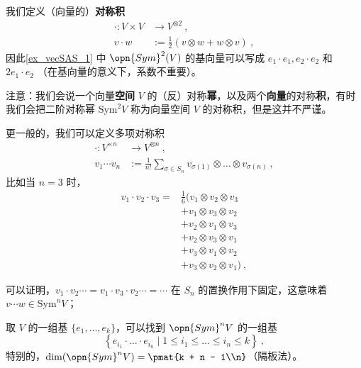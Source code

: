 我们定义（向量的）\textbf{对称积}
\begin{equation}
\begin{aligned}
\cdot: V \times V &\to V^{\otimes 2}~, \\
v \cdot w &:= \frac12 (v \otimes w + w \otimes v)~,
\end{aligned}
\end{equation}
因此\autoref{ex_vecSAS_1} 中 $\opn{Sym}^2(V)$ 的基向量可以写成 $e_1 \cdot e_1, e_2 \cdot e_2$ 和 $2 e_1 \cdot e_2$ （在基向量的意义下，系数不重要）。


注意：我们会说一个向量\textbf{空间} $V$ 的（反）对称\textbf{幂}，以及两个\textbf{向量}的对称\textbf{积}，有时我们会把二阶对称幂 $\text{Sym}^2 V$ 称为向量空间 $V$ 的对称积，但是这并不严谨。

更一般的，我们可以定义多项对称积
\begin{equation}
\begin{aligned}
\cdot: V^{\times n} &\to V^{\otimes n}~, \\
v_1 \cdots v_n &:= \frac{1}{n!} \sum_{\sigma \in S_n} v_{\sigma(1)} \otimes \dots \otimes v_{\sigma(n)}~,
\end{aligned}
\end{equation}
比如当 $n = 3$ 时，
\begin{equation}
\begin{aligned}
v_1 \cdot v_2 \cdot v_3 = &\frac16 (v_1 \otimes v_2 \otimes v_3 \\
&+ v_1 \otimes v_3 \otimes v_2 \\
&+ v_2 \otimes v_1 \otimes v_3 \\
&+ v_2 \otimes v_3 \otimes v_1 \\
&+ v_3 \otimes v_1 \otimes v_2 \\
&+ v_3 \otimes v_2 \otimes v_1)~,
\end{aligned}
\end{equation}

可以证明，$v_1 \cdot v_2 \cdots = v_1 \cdot v_3 \cdot v_2 \cdots = \cdots$ 在 $S_n$ 的置换作用下固定，这意味着$v \cdots w \in \text{Sym}^n V$；

取 $V$ 的一组基 $\{e_1, \dots, e_k\}$，可以找到 $\opn{Sym}^n V$ 的一组基
\begin{equation}
\left\{ e_{i_1} \cdot \dots \cdot e_{i_n} \mid 1 \leq i_1 \leq \dots \leq i_n \leq k \right\}~,
\end{equation}
特别的，$\dim(\opn{Sym}^n V) = \pmat{k + n - 1\\n}$（隔板法）。


